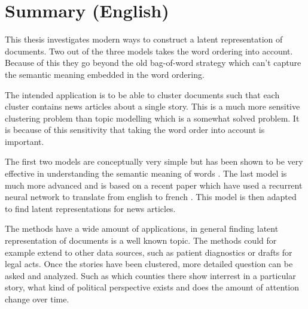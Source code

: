 \chapter{Summary (English)}

This thesis investigates modern ways to construct a latent representation of documents. Two out of the three models takes the word ordering into account. Because of this they go beyond the old bag-of-word strategy which can't capture the semantic meaning embedded in the word ordering. 

The intended application is to be able to cluster documents such that each cluster contains news articles about a single story. This is a much more sensitive clustering problem than topic modelling which is a somewhat solved problem. It is because of this sensitivity that taking the word order into account is important.

The first two models are conceptually very simple but has been shown to be very effective in understanding the semantic meaning of words \cite{word2vec-details, doc2vec}. The last model is much more advanced and is based on a recent paper which have used a recurrent neural network to translate from english to french \cite{sutskever}. This model is then adapted to find latent representations for news articles.

The methods have a wide amount of applications, in general finding latent representation of documents is a well known topic. The methods could for example extend to other data sources, such as patient diagnostics or drafts for legal acts.
Once the stories have been clustered, more detailed question can be asked and analyzed. Such as which counties there show interrest in a particular story, what kind of political perspective exists and does the amount of attention change over time.
